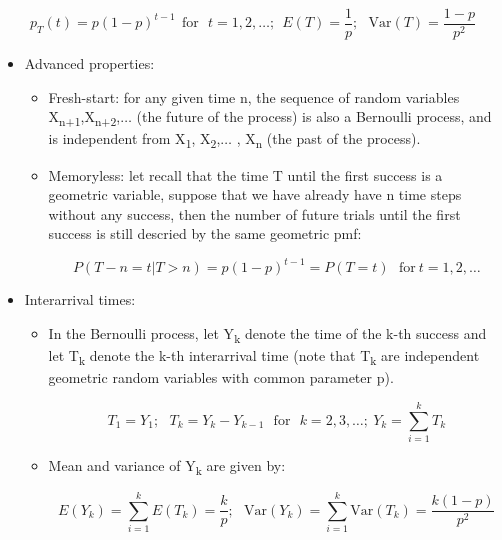 \documentclass[12pt]{report}
\renewcommand{\_}{\kern-1.5pt\textunderscore\kern-1.5pt}
\begin{document}
\begin{itemize}
\begin{itemize}
 \[ p_{T} \left( t \right) =p \left( 1-p \right) ^{t-1}~~\mathrm{for~~~}t=1,2, \ldots ;~~ E \left( T \right) =\frac{1}{p};~~~\mathrm{Var} \left( T \right) =\frac{1-p}{p^{2}} \] \par

\begin{itemize}
	\item Advanced properties:\par

\begin{itemize}
	\item Fresh-start: for any given time n, the sequence of random variables X\textsubscript{n+1},X\textsubscript{n+2},$ \ldots $  (the future of the process) is also a Bernoulli process, and is independent from X\textsubscript{1}, X\textsubscript{2},$ \ldots $ , X\textsubscript{n} (the past of the process).\par

	\item Memoryless: let recall that the time T until the first success is a geometric variable, suppose that we have already have n time steps without any success, then the number of future trials until the first success is still descried by the same geometric pmf:\par

 \[ P \left( T-n=t \vert T>n \right) =p \left( 1-p \right) ^{t-1}=P \left( T=t \right) ~~~\mathrm{for~}t=1, 2, \ldots  \] \par


\end{itemize}
	\item Interarrival times:\par

\begin{itemize}
	\item In the Bernoulli process, let Y\textsubscript{k} denote the time of the k-th success and let T\textsubscript{k} denote the k-th interarrival time (note that T\textsubscript{k} are independent geometric random variables with common parameter p).\par

 \[ T_{1}=Y_{1};~~~T_{k}=Y_{k}-Y_{k-1}~~~\mathrm{for~~~}k=2, 3, \ldots ;~Y_{k}= \sum _{i=1}^{k}T_{k} \] \par

	\item Mean and variance of Y\textsubscript{k} are given by:\par

 \[ E \left( Y_{k} \right) = \sum _{i=1}^{k}E \left( T_{k} \right) =\frac{k}{p};~~~\mathrm{Var} \left( Y_{k} \right) = \sum _{i=1}^{k}\mathrm{Var} \left( T_{k} \right) =\frac{k \left( 1-p \right) }{p^{2}} \] \par


\end{itemize}
\end{itemize}
\end{itemize}
\end{itemize}
\end{document}
